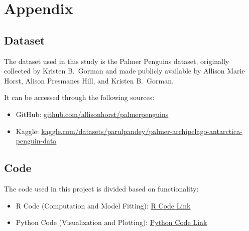 \documentclass[12pt]{article}
\begin{document}
\appendix
\section{Appendix}

\subsection{Dataset}

The dataset used in this study is the
Palmer Penguins dataset\cite{palmerpenguins},
originally collected by Kristen B.\ Gorman and made publicly
available by Allison Marie Horst, Alison Presmanes Hill, and
Kristen B.\ Gorman.

It can be accessed through the following sources:
\begin{itemize}
  \item GitHub:
    \href{https://github.com/allisonhorst/palmerpenguins}
    {github.com/allisonhorst/palmerpenguins}

  \item Kaggle:
    \href{https://www.kaggle.com/datasets/parulpandey/palmer-archipelago-antarctica-penguin-data}
    {kaggle.com/datasets/parulpandey/palmer-archipelago-antarctica-penguin-data}
\end{itemize}

\subsection{Code}

The code used in this project is divided based on functionality:
\begin{itemize}
  \item R Code (Computation and Model Fitting):
    \href{https://github.com/Bubu-Droid/palmer-penguins-lin-reg-sem-2/tree/main/codes/r-codes}
    {R Code Link}

  \item Python Code (Visualization and Plotting):
    \href{https://github.com/Bubu-Droid/palmer-penguins-lin-reg-sem-2/tree/main/codes/plots}
    {Python Code Link}
\end{itemize}



\end{document}
